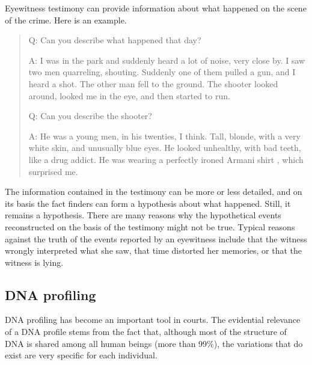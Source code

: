 \documentclass[10pt]{article}
\begin{document}
Eyewitness testimony can provide information about what 
happened on the scene of the crime. Here is an example.
%
\begin{quote}
Q: Can you describe what happened that day?

A: I was in the park and suddenly heard a lot of noise, very close by. I saw two men quarreling, shouting. Suddenly one of them pulled a gun, 
and I heard a shot. The other man fell to the ground. The shooter looked around, looked me in the eye, and then started to run.

Q: Can you describe the shooter?

A: He was a young men, in his twenties, I think. Tall, blonde, with a very white skin, and unusually blue eyes. 
He looked unhealthy, with bad teeth, 
like a drug addict. He was wearing a perfectly ironed Armani shirt%
, which surprised me. %
\end{quote}
%
The information contained in the testimony can be 
more or less detailed, and on its basis the fact finders
can form a hypothesis about what happened. 
Still, it remains a hypothesis. There are many reasons why the hypothetical events reconstructed on the basis of the testimony might not be true. Typical reasons against the truth of the events reported by an eyewitness include that the witness wrongly interpreted what she saw, that time distorted her memories, or that the witness is lying. 

\subsection{DNA profiling}

DNA profiling has become an important tool in courts. The evidential relevance of a DNA profile stems from the fact that, although most of the structure of DNA is shared among all human beings (more than 99\%), the variations that do exist are very specific for each individual. %
\end{document}
